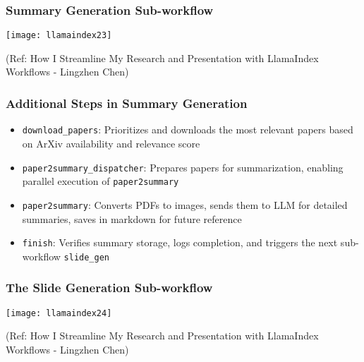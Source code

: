 \begin{frame}[fragile]\frametitle{Summary Generation Sub-workflow}

\begin{center}
\texttt{[image: llamaindex23]}

{\tiny (Ref: How I Streamline My Research and Presentation with LlamaIndex Workflows - Lingzhen Chen)}
\end{center}
\end{frame}

\begin{frame}[fragile]\frametitle{Additional Steps in Summary Generation}
  \begin{itemize}
    \item \texttt{download\_papers}: Prioritizes and downloads the most relevant papers based on ArXiv availability and relevance score
    \item \texttt{paper2summary\_dispatcher}: Prepares papers for summarization, enabling parallel execution of \texttt{paper2summary}
    \item \texttt{paper2summary}: Converts PDFs to images, sends them to LLM for detailed summaries, saves in markdown for future reference
    \item \texttt{finish}: Verifies summary storage, logs completion, and triggers the next sub-workflow \texttt{slide\_gen}
  \end{itemize}
\end{frame}

\begin{frame}[fragile]\frametitle{The Slide Generation Sub-workflow}

\begin{center}
\texttt{[image: llamaindex24]}

{\tiny (Ref: How I Streamline My Research and Presentation with LlamaIndex Workflows - Lingzhen Chen)}
\end{center}
\end{frame}

